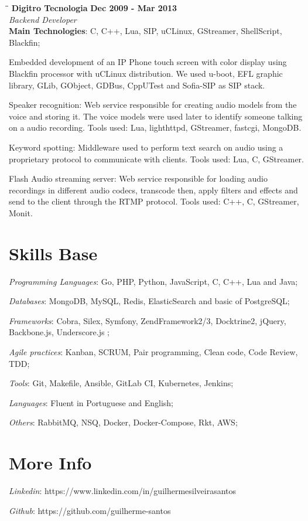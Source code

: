 \documentclass[margin]{res}
\begin{document}
\begin{resume}
\vspace{-0.1in}
    \begin{tabbing}
    \hspace{2.3in}\= \hspace{1.7in}\= \kill
    \textbf{Digitro Tecnologia}    \>\>\textbf{Dec 2009 - Mar 2013}\\
    \textit{Backend Developer}\\
    \textbf{Main Technologies}: C, C++, Lua, SIP, uCLinux, GStreamer, ShellScript, Blackfin;
    \end{tabbing}\vspace{-20pt}
    \vspace{2mm}
Embedded development of an IP Phone touch screen with color display using Blackfin processor with uCLinux distribution. We used u-boot, EFL graphic library, GLib, GObject, GDBus, CppUTest and Sofia-SIP as SIP stack.

Speaker recognition: Web service responsible for creating audio models from the voice and storing it. The voice models were used later to identify someone talking on a audio recording. Tools used: Lua, lighthttpd, GStreamer, fastcgi, MongoDB.

Keyword spotting: Middleware used to perform text search on audio using a proprietary protocol to communicate with clients. Tools used: Lua, C, GStreamer.

Flash Audio streaming server: Web service responsible for loading audio recordings in different audio codecs, transcode then, apply filters and effects and send to the client through the RTMP protocol. Tools used: C++, C, GStreamer, Monit.

\section{Skills Base} \textit{Programming Languages}: Go, PHP, Python, JavaScript, C, C++, Lua and Java;

	\textit{Databases}: MongoDB, MySQL, Redis, ElasticSearch and basic of PostgreSQL;

	\textit{Frameworks}: Cobra, Silex, Symfony, ZendFramework2/3, Docktrine2, jQuery, Backbone.js, Underscore.js ;

	\textit{Agile practices}: Kanban, SCRUM, Pair programming, Clean code, Code Review, TDD;

	\textit{Tools}: Git, Makefile, Ansible, GitLab CI, Kubernetes, Jenkins;

	\textit{Languages}: Fluent in Portuguese and English;

	\textit{Others}: RabbitMQ, NSQ, Docker, Docker-Compose, Rkt, AWS;

\section{More Info} \textit{Linkedin}: https://www.linkedin.com/in/guilhermesilveirasantos

    \textit{Github}: https://github.com/guilherme-santos

\end{resume}
\end{document}
